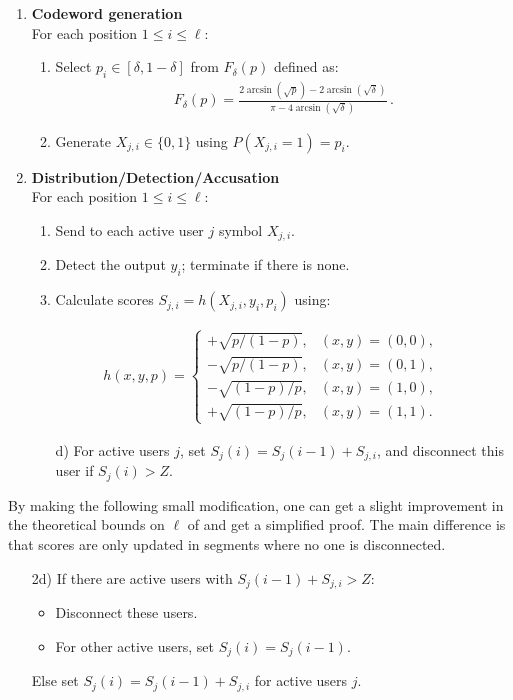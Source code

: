 \documentclass[10pt,a4paper,twocolumn]{article}
\begin{document}
\begin{enumerate}
	\item \textbf{Codeword generation} \\
	For each position $1 \leq i \leq \ell$:
	\begin{enumerate}
		\item Select $p_i \in [\delta, 1 - \delta]$ from $F_{\delta}(p)$ defined as:
		\begin{align}
			F_{\delta}(p) = \frac{2 \arcsin(\sqrt{p}) - 2 \arcsin(\sqrt{\delta})}{\pi - 4 \arcsin(\sqrt{\delta})}\, . \label{dist1}
		\end{align}
		\item Generate $X_{j,i} \in \{0,1\}$ using $P(X_{j,i} = 1) = p_i$.
	\end{enumerate}
	\item \textbf{Distribution/Detection/Accusation} \\
	For each position $1 \leq i \leq \ell$:
	\begin{enumerate}
		\item Send to each active user $j$ symbol $X_{j,i}$.
		\item Detect the output $y_i$; terminate if there is none.
		\item Calculate scores $S_{j,i} = h(X_{j,i},y_i,p_i)$ using:
	\end{enumerate}
		\begin{align}
		h(x,y,p) = \begin{cases}
			+\sqrt{p/(1 - p)}, & (x,y) = (0,0), \\
			-\sqrt{p/(1 - p)}, & (x,y) = (0,1), \\
			-\sqrt{(1 - p)/p}, & (x,y) = (1,0), \\
			+\sqrt{(1 - p)/p}, & (x,y) = (1,1).
		\end{cases} \label{scoresym}
		\end{align}
	\begin{enumerate}
		\item[d)] For active users $j$, set $S_j(i) = S_j(i-1) + S_{j,i}$, and disconnect this user if $S_j(i) > Z$.
	\end{enumerate}
\end{enumerate}

By making the following small modification, one can get a slight improvement in the theoretical bounds on $\ell$ of \cite{laarhoven13tit} and get a simplified proof. The main difference is that scores are only updated in segments where no one is disconnected.

\begin{enumerate}
	\item[2d)] If there are active users with $S_j(i-1) + S_{j,i} > Z$:
	\begin{itemize}
		\item Disconnect these users. 
		\item For other active users, set $S_j(i) = S_j(i-1)$.
	\end{itemize}
	\hspace{0.7cm}Else set $S_j(i) = S_j(i-1) + S_{j,i}$ for active users $j$. 
\end{enumerate}
\end{document}
